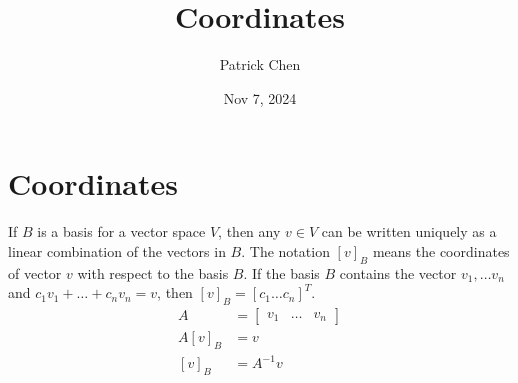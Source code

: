 \documentclass{article}
\title{Coordinates}
\author{Patrick Chen}
\date{Nov 7, 2024}
\theoremstyle{mytheoremstyle}
\theoremstyle{mytheoremstyle}
\theoremstyle{myproblemstyle}
\begin{document}
    \maketitle
    \section*{Coordinates}
    If $B$ is a basis for a vector space $V$, then any $v\in V$ can be written
    uniquely as a linear combination of the vectors in $B$. The notation $[v]_B$
    means the coordinates of vector $v$ with respect to the basis $B$. If the
    basis $B$ contains the vector $v_1,\dots v_n$ and $c_1v_1+\dots+c_nv_n=v$,
    then $[v]_B=[c_1 \dots c_n]^T$.
    \begin{align*}
        A &= \begin{bmatrix}
            v_1 & \dots & v_n
        \end{bmatrix} \\
        A[v]_B &= v \\
        [v]_B &= A^{-1}v
    \end{align*}
\end{document}
